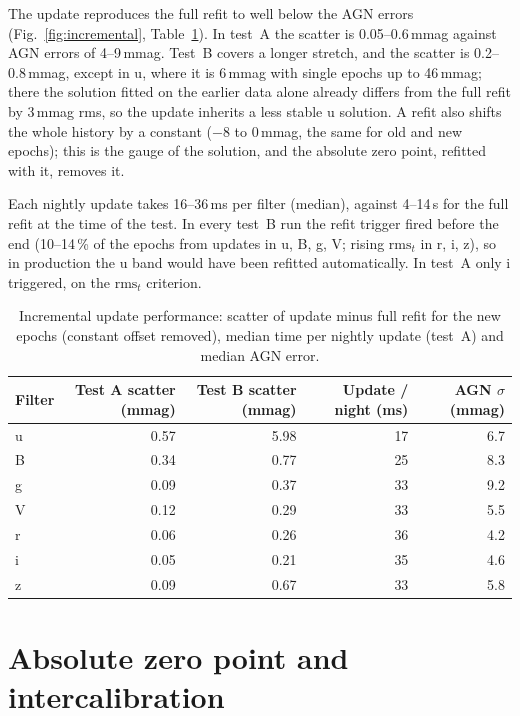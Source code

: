 \documentclass[10pt,a4paper,oneside]{report}
\renewcommand{\_}{\oldunderscore\allowbreak}
\begin{document}
The update reproduces the full refit to well below the AGN errors (Fig.~\ref{fig:incremental},
Table~\ref{tab:incremental}). In test~A the scatter is 0.05--0.6\,mmag against AGN errors of
4--9\,mmag. Test~B covers a longer stretch, and the scatter is 0.2--0.8\,mmag, except in u, where it is
6\,mmag with single epochs up to 46\,mmag; there the solution fitted on the earlier data alone already
differs from the full refit by 3\,mmag rms, so the update inherits a less stable u solution. A refit
also shifts the whole history by a constant ($-8$ to 0\,mmag, the same for old and new epochs); this is
the gauge of the solution, and the absolute zero point, refitted with it, removes it.

Each nightly update takes 16--36\,ms per filter (median), against 4--14\,s for the full refit at the
time of the test. In every test~B run the refit trigger fired before the end (10--14\,\% of the epochs
from updates in u, B, g, V; rising $\mathrm{rms}_t$ in r, i, z), so in production the u band would have
been refitted automatically. In test~A only i triggered, on the $\mathrm{rms}_t$ criterion.

\begin{table}[htbp]
\centering
\caption{Incremental update performance: scatter of update minus full refit for the new epochs
  (constant offset removed), median time per nightly update (test~A) and median AGN error.}
\label{tab:incremental}
\small
\begin{tabular}{lrrrr}
\toprule
Filter & Test A scatter (mmag) & Test B scatter (mmag) & Update / night (ms) & AGN $\sigma$ (mmag) \\
\midrule
u & 0.57 & 5.98 & 17 & 6.7 \\
B & 0.34 & 0.77 & 25 & 8.3 \\
g & 0.09 & 0.37 & 33 & 9.2 \\
V & 0.12 & 0.29 & 33 & 5.5 \\
r & 0.06 & 0.26 & 36 & 4.2 \\
i & 0.05 & 0.21 & 35 & 4.6 \\
z & 0.09 & 0.67 & 33 & 5.8 \\
\bottomrule
\end{tabular}
\end{table}

\chapter{Absolute zero point and intercalibration}
\label{ch:zp}
\end{document}
